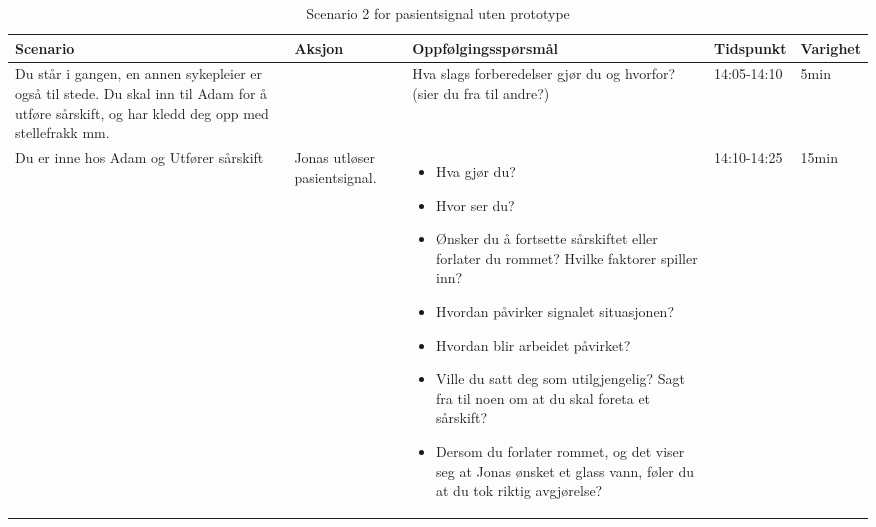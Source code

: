 \begin{table}[H]
\small
\begin{tabular}{p{3cm}|p{2cm}|p{4cm}|l|l}
\hline
\textbf{Scenario} & \textbf{Aksjon} & \textbf{Oppfølgingsspørsmål} & \textbf{Tidspunkt} & \textbf{Varighet}\\
\hline
Du står i gangen, en annen sykepleier er også til stede. Du skal inn til Adam for å utføre sårskift, og har kledd deg opp med stellefrakk  mm. & & Hva slags forberedelser gjør du og hvorfor? (sier du fra til andre?)
& 14:05-14:10 & 5min\\
\hline
Du er inne hos Adam og Utfører sårskift & Jonas utløser pasientsignal. & 
\begin{itemize}
\item Hva gjør du?
\item Hvor ser du?
\item Ønsker du å fortsette sårskiftet eller forlater du rommet? Hvilke faktorer spiller inn?
\item Hvordan påvirker signalet situasjonen?
\item Hvordan blir arbeidet påvirket?
\item Ville du satt deg som utilgjengelig? Sagt fra til noen om at du skal foreta et sårskift?
\item Dersom du forlater rommet, og det viser seg at Jonas ønsket et glass vann, føler du at du tok riktig avgjørelse?
\end{itemize}
 & 14:10-14:25 & 15min\\
\end{tabular}
\caption{Scenario 2 for pasientsignal uten prototype}
\label{Steg3.2}
\end{table}

\pagebreak

